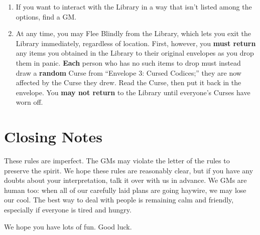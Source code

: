 \documentclass[sheet]{GL2020}
\begin{document}
\begin{enumerate}
	\item If you want to interact with the Library in a way that isn’t listed among the options, find a GM.
	\item At any time, you may Flee Blindly from the Library, which lets you exit the Library immediately, regardless of location. First, however, you \textbf{must return} any items you obtained in the Library to their original envelopes as you drop them in panic. \textbf{Each} person who has no such items to drop must instead draw a \textbf{random} Curse from “Envelope 3: Cursed Codices;” they are now affected by the Curse they drew. Read the Curse, then put it back in the envelope. You \textbf{may not return} to the Library until everyone's Curses have worn off. 
\end{enumerate}

\section{Closing Notes}

These rules are imperfect. The GMs may violate the letter of the rules to preserve the spirit. We hope these rules are reasonably clear, but if you have any doubts about your interpretation, talk it over with us in advance. We GMs are human too: when all of our carefully laid plans are going haywire, we may lose our cool. The best way to deal with people is remaining calm and friendly, especially if everyone is tired and hungry.

We hope you have lots of fun. Good luck.
\end{document}
